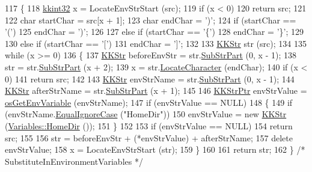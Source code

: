 \begin{DoxyCode}
117 \{
118   \hyperlink{namespace_k_k_b_a8fa4952cc84fda1de4bec1fbdd8d5b1b}{kkint32}  x = LocateEnvStrStart (src);
119   \textcolor{keywordflow}{if}  (x < 0)
120     \textcolor{keywordflow}{return}  src;
121 
122   \textcolor{keywordtype}{char}  startChar = src[x + 1];
123   \textcolor{keywordtype}{char}  endChar = \textcolor{charliteral}{')'};
124   \textcolor{keywordflow}{if}  (startChar == \textcolor{charliteral}{'('})
125     endChar = \textcolor{charliteral}{')'};
126 
127   \textcolor{keywordflow}{else} \textcolor{keywordflow}{if}  (startChar == \textcolor{charliteral}{'\{'})
128     endChar = \textcolor{charliteral}{'\}'};
129 
130   \textcolor{keywordflow}{else} \textcolor{keywordflow}{if}  (startChar == \textcolor{charliteral}{'['})
131     endChar = \textcolor{charliteral}{']'};
132 
133   \hyperlink{class_k_k_b_1_1_k_k_str}{KKStr}  str (src);
134 
135   \textcolor{keywordflow}{while}  (x >= 0)
136   \{
137     \hyperlink{class_k_k_b_1_1_k_k_str}{KKStr}  beforeEnvStr = str.\hyperlink{class_k_k_b_1_1_k_k_str_a5f20b2ddfc9f07c8ef99592810332ddb}{SubStrPart} (0, x - 1);
138     str = str.\hyperlink{class_k_k_b_1_1_k_k_str_a5f20b2ddfc9f07c8ef99592810332ddb}{SubStrPart} (x + 2);
139     x = str.\hyperlink{class_k_k_b_1_1_k_k_str_ad738b238e609887bbf27841f359046cd}{LocateCharacter} (endChar);
140     \textcolor{keywordflow}{if}  (x < 0)
141       \textcolor{keywordflow}{return}  src;
142 
143     \hyperlink{class_k_k_b_1_1_k_k_str}{KKStr}  envStrName   = str.\hyperlink{class_k_k_b_1_1_k_k_str_a5f20b2ddfc9f07c8ef99592810332ddb}{SubStrPart} (0, x - 1);
144     \hyperlink{class_k_k_b_1_1_k_k_str}{KKStr}  afterStrName = str.\hyperlink{class_k_k_b_1_1_k_k_str_a5f20b2ddfc9f07c8ef99592810332ddb}{SubStrPart} (x + 1);
145 
146     \hyperlink{class_k_k_b_1_1_k_k_str}{KKStrPtr} envStrValue = \hyperlink{namespace_k_k_b_a79021cf399003101255658938ec63065}{osGetEnvVariable} (envStrName);
147     \textcolor{keywordflow}{if}  (envStrValue == NULL)
148     \{
149       \textcolor{keywordflow}{if}  (envStrName.\hyperlink{class_k_k_b_1_1_k_k_str_a562f9696417c53f66bc4088eac072ab5}{EqualIgnoreCase} (\textcolor{stringliteral}{"HomeDir"}))
150         envStrValue = \textcolor{keyword}{new} \hyperlink{class_k_k_b_1_1_k_k_str}{KKStr} (\hyperlink{class_k_k_l_s_c_1_1_variables_a14411ff6b8df71995b4bec024bc5a69f}{Variables::HomeDir} ());
151     \}
152 
153     \textcolor{keywordflow}{if}  (envStrValue == NULL)
154       \textcolor{keywordflow}{return}  src;
155 
156     str = beforeEnvStr + (*envStrValue)  + afterStrName;
157     \textcolor{keyword}{delete}  envStrValue;
158     x = LocateEnvStrStart (str);
159   \}
160 
161   \textcolor{keywordflow}{return}  str;
162 \}  \textcolor{comment}{/* SubstituteInEnvironmentVariables */}
\end{DoxyCode}


